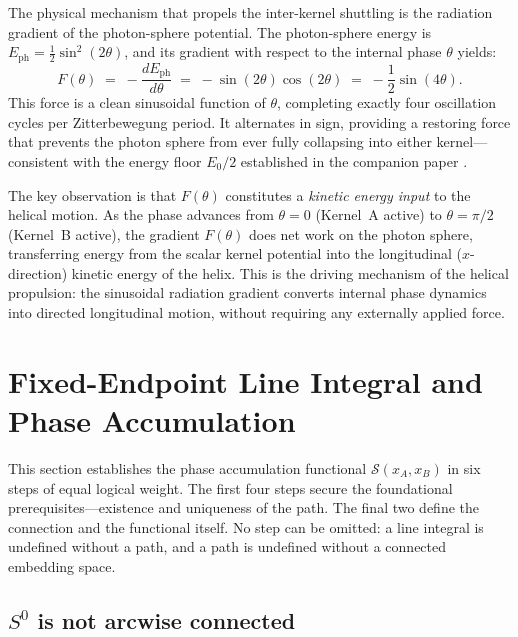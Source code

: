 \documentclass[%
 reprint, amsmath,amssymb, aps, prb, ]{revtex4-2}
\numberwithin{equation}{section}
\newcommand{\iphase}{\theta}  %
\begin{document}
The physical mechanism that propels the inter-kernel shuttling is the radiation gradient of the photon-sphere potential. The photon-sphere energy is $E_{\text{ph}} = \tfrac{1}{2}\sin^2(2\iphase)$, and its gradient with respect to the internal phase $\iphase$ yields:
\begin{equation}
F(\iphase) \;=\; -\frac{dE_{\text{ph}}}{d\iphase} \;=\; -\sin(2\iphase)\cos(2\iphase) \;=\; -\frac{1}{2}\sin(4\iphase).
\label{eq:radiation_force}
\end{equation}
This force is a clean sinusoidal function of $\iphase$, completing exactly four oscillation cycles per Zitterbewegung period. It alternates in sign, providing a restoring force that prevents the photon sphere from ever fully collapsing into either kernel---consistent with the energy floor $E_0/2$ established in the companion paper \cite{hanamura46}.

The key observation is that $F(\iphase)$ constitutes a \emph{kinetic energy input} to the helical motion. As the phase advances from $\iphase=0$ (Kernel~A active) to $\iphase=\pi/2$ (Kernel~B active), the gradient $F(\iphase)$ does net work on the photon sphere, transferring energy from the scalar kernel potential into the longitudinal ($x$-direction) kinetic energy of the helix. This is the driving mechanism of the helical propulsion: the sinusoidal radiation gradient converts internal phase dynamics into directed longitudinal motion, without requiring any externally applied force.

\section{Fixed-Endpoint Line Integral and Phase Accumulation}
\label{sec:fixedend}

This section establishes the phase accumulation functional $\mathcal{S}(x_A,x_B)$ in six steps of equal logical weight. The first four steps secure the foundational prerequisites---existence and uniqueness of the path. The final two define the connection and the functional itself. No step can be omitted: a line integral is undefined without a path, and a path is undefined without a connected embedding space.

\subsection{$S^0$ is not arcwise connected}
\label{subsec:s0_not_arcwise}
\end{document}
